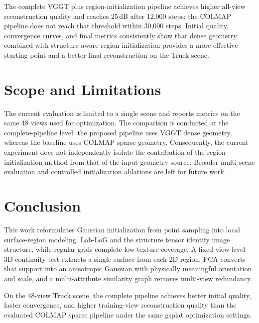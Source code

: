 \documentclass[11pt,a4paper]{article}
\begin{document}
The complete VGGT plus region-initialization pipeline achieves higher all-view reconstruction quality and reaches 25\,dB after 12,000 steps; the COLMAP pipeline does not reach that threshold within 30,000 steps. Initial quality, convergence curves, and final metrics consistently show that dense geometry combined with structure-aware region initialization provides a more effective starting point and a better final reconstruction on the Truck scene.

\section{Scope and Limitations}

The current evaluation is limited to a single scene and reports metrics on
the same 48 views used for optimization. The comparison is conducted at the
complete-pipeline level: the proposed pipeline uses VGGT dense geometry,
whereas the baseline uses COLMAP sparse geometry. Consequently, the current
experiment does not independently isolate the contribution of the region
initialization method from that of the input geometry source. Broader
multi-scene evaluation and controlled initialization ablations are left for
future work.

\section{Conclusion}

This work reformulates Gaussian initialization from point sampling into local surface-region modeling. Lab-LoG and the structure tensor identify image structure, while regular grids complete low-texture coverage. A fixed view-level 3D continuity test extracts a single surface from each 2D region, PCA converts that support into an anisotropic Gaussian with physically meaningful orientation and scale, and a multi-attribute similarity graph removes multi-view redundancy.

On the 48-view Truck scene, the complete pipeline achieves better initial quality, faster convergence, and higher training-view reconstruction quality than the evaluated COLMAP sparse pipeline under the same gsplat optimization settings.
\end{document}
